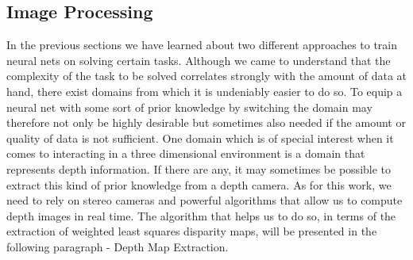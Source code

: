 \subsection{Image Processing}
In the previous sections we have learned about two different approaches to train neural nets on solving certain tasks. Although we came to understand that the complexity of the task to be solved correlates strongly with the amount of data at hand, there exist domains from which it is undeniably easier to do so. To equip a neural net with some sort of prior knowledge by switching the domain may therefore not only be highly desirable but sometimes also needed if the amount or quality of data is not sufficient. One domain which is of special interest when it comes to interacting in a three dimensional environment is a domain that represents depth information. If there are any, it may sometimes be possible to extract this kind of prior knowledge from a depth camera. As for this work, we need to rely on stereo cameras and powerful algorithms that allow us to compute depth images in real time. The algorithm that helps us to do so, in terms of the extraction of weighted least squares disparity maps, will be presented in the following paragraph - Depth Map Extraction.
